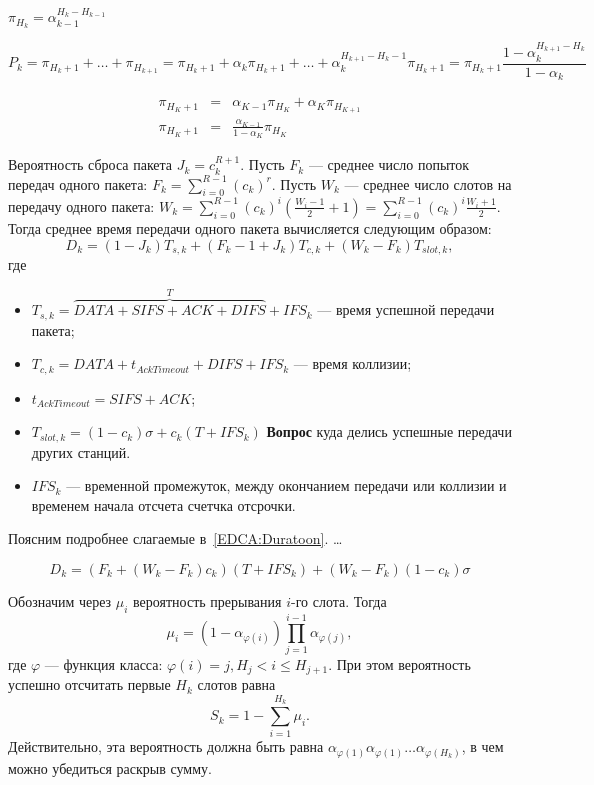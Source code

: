 $\pi_{H_k} = \alpha_{k-1}^{H_k-H_{k-1}}$

\begin{equation}
P_k = \pi_{H_k+1} + \dots + \pi_{H_{k+1}} = \pi_{H_k+1} + \alpha_k \pi_{H_k+1} + \dots + \alpha_k^{H_{k+1}-H_k-1}\pi_{H_k+1} = \pi_{H_k+1} \frac{1-\alpha_k^{H_{k+1}-H_k}}{1-\alpha_k}
\end{equation}

\begin{eqnarray}
\pi_{H_{K}+1} & = & \alpha_{K-1}\pi_{H_{K}} + \alpha_{K} \pi_{H_{K+1}} \\
\pi_{H_{K}+1} & = & \frac{\alpha_{K-1}}{1-\alpha_{K}}\pi_{H_K}
\end{eqnarray}

Вероятность сброса пакета $J_k = c_k^{R+1}$. 
Пусть $F_k$ --- среднее число попыток передач одного пакета: $F_k = \sum\limits_{i = 0}^{R-1} (c_k)^r$. Пусть $W_k$ --- среднее число слотов на передачу одного пакета: $W_k = \sum\limits_{i=0}^{R-1} (c_k)^i \left(\frac{W_{i}-1}{2} + 1 \right) = \sum\limits_{i=0}^{R-1} (c_k)^i \frac{W_{i}+1}{2}$. Тогда среднее время передачи одного пакета вычисляется следующим образом:
\begin{equation}
\label{EDCA:Duratoon}
D_k = (1-J_k)T_{s,k} + (F_{k}-1+J_k)T_{c,k} + (W_k-F_k)T_{slot,k},
\end{equation}
где 
\begin{itemize}
\item $T_{s,k} = \overbrace{DATA + SIFS + ACK + DIFS}^{T} + IFS_k$ --- время успешной передачи пакета;
\item $T_{c,k} = DATA + t_{AckTimeout} + DIFS + IFS_k$ --- время коллизии;
\item $t_{AckTimeout} = SIFS + ACK$;
\item $T_{slot,k} = (1-c_k)\sigma + c_k(T+IFS_k)$ \textbf{Вопрос} куда делись успешные передачи других станций.
\item $IFS_k$ --- временной промежуток, между окончанием передачи или коллизии и временем начала отсчета счетчка отсрочки.
\end{itemize}
Поясним подробнее слагаемые в~\eqref{EDCA:Duratoon}. \dots

\begin{equation}
D_k = (F_k + (W_k-F_k)c_k)(T+IFS_k) + (W_k - F_k)(1-c_k)\sigma
\end{equation}

Обозначим через $\mu_i$ вероятность прерывания $i$-го слота. Тогда
\begin{equation}
\mu_i = (1-\alpha_{\varphi(i)})\prod\limits_{j = 1} ^{i-1} \alpha_{\varphi(j)},
\end{equation}
где $\varphi$ --- функция класса: $\varphi(i) = j, H_j < i \leqslant H_{j+1}$. При этом вероятность успешно отсчитать первые $H_k$ слотов равна 
\begin{equation}
S_k = 1 - \sum\limits_{i=1}^{H_k} \mu_i.
\end{equation}
Действительно, эта вероятность должна быть равна $\alpha_{\varphi(1)}\alpha_{\varphi(1)}\dots\alpha_{\varphi(H_k)}$, в чем можно убедиться раскрыв сумму.

